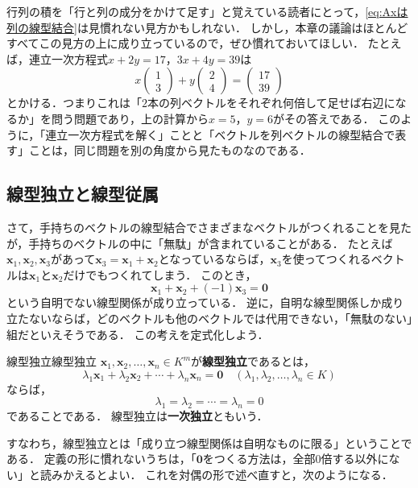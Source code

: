 行列の積を「行と列の成分をかけて足す」と覚えている読者にとって，\eqref{eq:Axは列の線型結合}は見慣れない見方かもしれない．
しかし，本章の議論はほとんどすべてこの見方の上に成り立っているので，ぜひ慣れておいてほしい．
たとえば，連立一次方程式$x + 2y = 17$，$3x + 4y = 39$は
\[
  x \begin{pmatrix} 1 \\ 3 \end{pmatrix} + y \begin{pmatrix} 2 \\ 4 \end{pmatrix} = \begin{pmatrix} 17 \\ 39 \end{pmatrix}
\]
とかける．つまりこれは「$2$本の列ベクトルをそれぞれ何倍して足せば右辺になるか」を問う問題であり，上の計算から$x = 5$，$y = 6$がその答えである．
このように，「連立一次方程式を解く」ことと「ベクトルを列ベクトルの線型結合で表す」ことは，同じ問題を別の角度から見たものなのである．

\subsection{線型独立と線型従属}

さて，手持ちのベクトルの線型結合でさまざまなベクトルがつくれることを見たが，手持ちのベクトルの中に「無駄」が含まれていることがある．
たとえば$\bm{x}_1,\bm{x}_2,\bm{x}_3$があって$\bm{x}_3 = \bm{x}_1 + \bm{x}_2$となっているならば，$\bm{x}_3$を使ってつくれるベクトルは$\bm{x}_1$と$\bm{x}_2$だけでもつくれてしまう．
このとき，
\[
  \bm{x}_1 + \bm{x}_2 + (-1)\bm{x}_3 = \bm{0}
\]
という自明でない線型関係が成り立っている．
逆に，自明な線型関係しか成り立たないならば，どのベクトルも他のベクトルでは代用できない，「無駄のない」組だといえそうである．
この考えを定式化しよう．

\begin{definition}{線型独立}{線型独立}
  $\bm{x}_1, \bm{x}_2, \dots, \bm{x}_n \in K^m$が\textbf{線型独立}であるとは，
  \[
    \lambda_1 \bm{x}_1 + \lambda_2 \bm{x}_2 + \cdots + \lambda_n \bm{x}_n = \bm{0}
    \quad (\lambda_1, \lambda_2, \dots, \lambda_n \in K)
  \]
  ならば，
  \[
    \lambda_1=\lambda_2=\cdots=\lambda_n = 0
  \]
  であることである．
  線型独立は\textbf{一次独立}ともいう．
\end{definition}

すなわち，線型独立とは「成り立つ線型関係は自明なものに限る」ということである．
定義の形に慣れないうちは，「$\bm{0}$をつくる方法は，全部$0$倍する以外にない」と読みかえるとよい．
これを対偶の形で述べ直すと，次のようになる．

